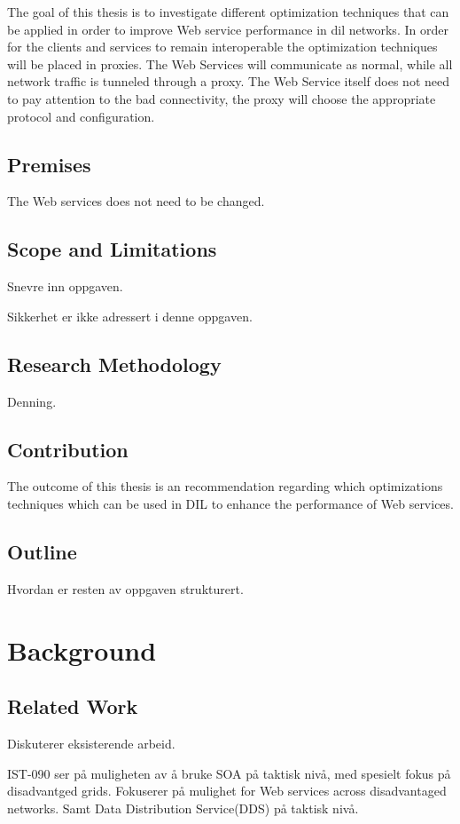 \documentclass[USenglish]{ifimaster}
\begin{document}
The goal of this thesis is to investigate different optimization techniques that
can be applied in order to improve Web service performance in \gls{dil}
networks. In order for the clients and services to remain interoperable the
optimization techniques will be placed in proxies. The Web Services will
communicate as normal, while all network traffic is tunneled through a proxy.
The Web Service itself does not need to pay attention to the bad connectivity,
the proxy will choose the appropriate protocol and configuration.

\section{Premises}
The Web services does not need to be changed.

\section{Scope and Limitations}
Snevre inn oppgaven.

Sikkerhet er ikke adressert i denne oppgaven.
\section{Research Methodology}
Denning.

\section{Contribution}
The outcome of this thesis is an recommendation regarding which optimizations
techniques which can be used in DIL to enhance the performance of Web services.
\section{Outline}
Hvordan er resten av oppgaven strukturert.


\chapter{Background}
\section{Related Work}
Diskuterer eksisterende arbeid.

IST-090 ser på muligheten av å bruke SOA på taktisk nivå, med spesielt fokus på
disadvantged grids. Fokuserer på mulighet for Web services across disadvantaged
networks. Samt Data Distribution Service(DDS) på taktisk nivå.
\end{document}
